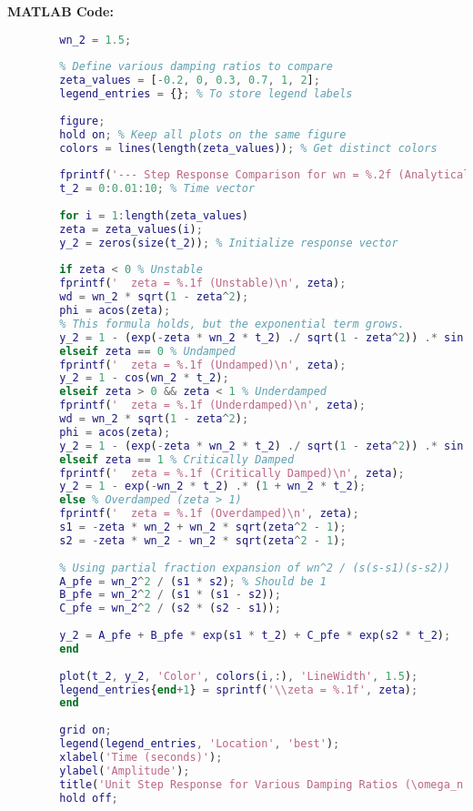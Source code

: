 \documentclass{article}
\begin{document}
	\textbf{MATLAB Code:}
	\begin{lstlisting}[language=Matlab, caption=MATLAB Code for Problem 2 (Using Formulas)]
		% Define constant natural frequency
		wn_2 = 1.5;
		
		% Define various damping ratios to compare
		zeta_values = [-0.2, 0, 0.3, 0.7, 1, 2];
		legend_entries = {}; % To store legend labels
		
		figure;
		hold on; % Keep all plots on the same figure
		colors = lines(length(zeta_values)); % Get distinct colors
		
		fprintf('--- Step Response Comparison for wn = %.2f (Analytical Plots) ---\n', wn_2);
		t_2 = 0:0.01:10; % Time vector
		
		for i = 1:length(zeta_values)
		zeta = zeta_values(i);
		y_2 = zeros(size(t_2)); % Initialize response vector
		
		if zeta < 0 % Unstable
		fprintf('  zeta = %.1f (Unstable)\n', zeta);
		wd = wn_2 * sqrt(1 - zeta^2);
		phi = acos(zeta);
		% This formula holds, but the exponential term grows.
		y_2 = 1 - (exp(-zeta * wn_2 * t_2) ./ sqrt(1 - zeta^2)) .* sin(wd * t_2 + phi);
		elseif zeta == 0 % Undamped
		fprintf('  zeta = %.1f (Undamped)\n', zeta);
		y_2 = 1 - cos(wn_2 * t_2);
		elseif zeta > 0 && zeta < 1 % Underdamped
		fprintf('  zeta = %.1f (Underdamped)\n', zeta);
		wd = wn_2 * sqrt(1 - zeta^2);
		phi = acos(zeta);
		y_2 = 1 - (exp(-zeta * wn_2 * t_2) ./ sqrt(1 - zeta^2)) .* sin(wd * t_2 + phi);
		elseif zeta == 1 % Critically Damped
		fprintf('  zeta = %.1f (Critically Damped)\n', zeta);
		y_2 = 1 - exp(-wn_2 * t_2) .* (1 + wn_2 * t_2);
		else % Overdamped (zeta > 1)
		fprintf('  zeta = %.1f (Overdamped)\n', zeta);
		s1 = -zeta * wn_2 + wn_2 * sqrt(zeta^2 - 1);
		s2 = -zeta * wn_2 - wn_2 * sqrt(zeta^2 - 1);
		
		% Using partial fraction expansion of wn^2 / (s(s-s1)(s-s2))
		A_pfe = wn_2^2 / (s1 * s2); % Should be 1
		B_pfe = wn_2^2 / (s1 * (s1 - s2));
		C_pfe = wn_2^2 / (s2 * (s2 - s1));
		
		y_2 = A_pfe + B_pfe * exp(s1 * t_2) + C_pfe * exp(s2 * t_2);
		end
		
		plot(t_2, y_2, 'Color', colors(i,:), 'LineWidth', 1.5);
		legend_entries{end+1} = sprintf('\\zeta = %.1f', zeta);
		end
		
		grid on;
		legend(legend_entries, 'Location', 'best');
		xlabel('Time (seconds)');
		ylabel('Amplitude');
		title('Unit Step Response for Various Damping Ratios (\omega_n = 1.5) (Analytical Plots)');
		hold off;
	\end{lstlisting}
	
\end{document}

